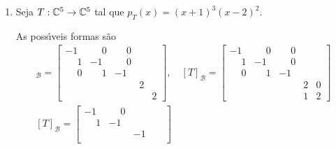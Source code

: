 \begin{exemplo}
\begin{enumerate}
\begin{solucao}
			Se $r = 1$, ent\~ao
			\[
				[T_2]_{\mathcal{B}_2} = \left[\begin{tabular}{ccc}
 					3 & 0 & 0\\
 					0 & 3 & 0\\
 					0 & 0 & 3
				\end{tabular}
				\right].
			\]
			Se $r = 2$, ent\~ao
			\[
				[T_1]_{\mathcal{B}_1} = \left[\begin{tabular}{cc|c}
 					3 & 0 & \\
 					1 & 3 & \\ \cline{1-3}
 					&  & 3
 				\end{tabular}
				\right].
			\]
			Se $r = 3$, ent\~ao
			\[
				[T_1]_{\mathcal{B}_1} = \left[\begin{tabular}{ccc}
 						3 & 0 & 0 \\
 						1 & 3 & 0 \\
 						0 & 1 & 3
					\end{tabular}
				\right].
			\]
			Logo existem 15 poss{\'\i}veis formas de Jordan para $T$.
		\end{solucao}
		\item Seja $T : \mathbb{C}^5 \to \mathbb{C}^5$ tal que $p_T(x) = (x + 1)^3(x - 2)^2$.
		\begin{solucao}
			As poss{\'\i}veis formas s\~ao
			\begin{align*}
				[T]_\mathcal{B} = \begin{bmatrix}
					-1 & \phantom{-}0 & \phantom{-}0 & &\\
					\phantom{-}1 & -1 & \phantom{-}0 & & \\
					\phantom{-}0 & \phantom{-}1 & -1 & &\\
					& & & 2 & \\
					& & & & 2
				\end{bmatrix}, \quad [T]_\mathcal{B} = \begin{bmatrix}
					-1 & \phantom{-}0 & \phantom{-}0 & &\\
					\phantom{-}1 & -1 & \phantom{-}0 & & \\
					\phantom{-}0 & \phantom{-}1 & -1 & &\\
					& & & 2 & 0\\
					& & & 1 & 2
				\end{bmatrix}\\
				[T]_\mathcal{B} = \begin{bmatrix}
					-1 & \phantom{-}0 & & &\\
					\phantom{-}1 & -1 & & & \\
					 &  & -1 & &\\

\end{bmatrix}
\end{align*}
\end{solucao}
\end{enumerate}
\end{exemplo}
